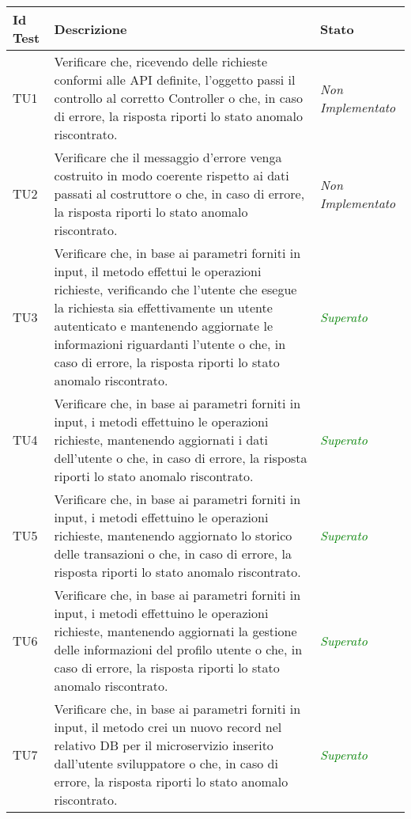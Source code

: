 	\normalsize
	\begin{longtable}{|>{\centering\arraybackslash}p{1.5cm}|>{\centering\arraybackslash}p{8cm} | >{\centering\arraybackslash}p{3.8cm}|}
		\hline \rowcolor{Gray}
		\textbf{Id Test} & \textbf{Descrizione} & \textbf{Stato}\\
		\hline
		\endhead
		\hypertarget{TU1}{TU1} & Verificare che, ricevendo delle richieste conformi alle API definite, l’oggetto passi il controllo al corretto Controller o che, in caso di errore, la risposta riporti lo stato anomalo riscontrato. & \textit{Non Implementato}\\ \hline
		\hypertarget{TU2}{TU2} & Verificare che il messaggio d’errore venga costruito in modo coerente rispetto ai dati passati al costruttore o che, in caso di errore, la risposta riporti lo stato anomalo riscontrato. & \textit{Non Implementato}\\ \hline
		\hypertarget{TU3}{TU3} & Verificare che, in base ai parametri forniti in input, il metodo effettui le operazioni richieste, verificando che l’utente che esegue la richiesta sia effettivamente
		un utente autenticato e mantenendo aggiornate le
		informazioni riguardanti l’utente
		o che, in caso di errore, la risposta riporti lo stato
		anomalo riscontrato. & \textcolor{Green}{\textit{Superato}}\\ \hline
		\hypertarget{TU4}{TU4} & Verificare che, in base ai parametri forniti in input, i
		metodi effettuino le operazioni richieste, mantenendo
		aggiornati i dati dell'utente o che, in caso di
		errore, la risposta riporti lo stato anomalo riscontrato. & \textcolor{Green}{\textit{Superato}}\\ \hline
		\hypertarget{TU5}{TU5} & Verificare che, in base ai parametri forniti in input, i
		metodi effettuino le operazioni richieste, mantenendo
		aggiornato lo storico delle transazioni o che, in caso di errore, la risposta riporti lo stato anomalo riscontrato. & \textcolor{Green}{\textit{Superato}}\\ \hline
		\hypertarget{TU6}{TU6} & Verificare che, in base ai parametri forniti in input, i metodi effettuino le operazioni richieste, mantenendo aggiornati la gestione delle informazioni del profilo utente o che, in caso di errore, la risposta riporti lo stato anomalo riscontrato. & \textcolor{Green}{\textit{Superato}}\\ \hline
		\hypertarget{TU7}{TU7} & Verificare che, in base ai parametri forniti in input,	il metodo crei un nuovo record nel relativo DB per il microservizio inserito dall'utente sviluppatore o che, in caso di errore, la risposta riporti lo stato anomalo riscontrato. & \textcolor{Green}{\textit{Superato}}\\ \hline

\end{longtable}
